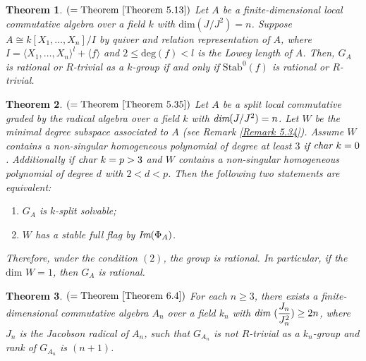 \documentclass[12pt]{amsart}
\newtheorem{thmI}{Theorem}
\theoremstyle{definition}
\numberwithin{equation}{section}
\begin{document}
\begin{thmI}
$(=\text{Theorem }\ref{Theorem 5.13})$ Let $A$ be a finite-dimensional local commutative algebra over a field $k$ with $\text{dim}(J/J^2)=n$. Suppose $A\cong k[X_1,\dots, X_n]/I$ by quiver and relation representation of $A$, where $I=\langle X_1,\dots, X_n\rangle^l+\langle f\rangle$ and $2\leq \mathrm{ deg}(f)<l$ is the Lowey length of $A$. Then, $G_A$ is rational or $R$-trivial as a $k$-group if and only if $\mathrm{Stab}^{0}(f)$ is rational or $R$-trivial.
\end{thmI}
\vskip2mm
\begin{thmI}
$(=\text{Theorem }\ref{Theorem 5.35})$ Let $A$ be a split local commutative graded by the radical algebra over a field $k$ with $\emph{dim}(J/J^2)=n$. Let $W$ be the minimal degree subspace associated to $A$ (see Remark \ref{Remark 5.34}). Assume $W$ contains a non-singular homogeneous polynomial of degree at least $3$ if $\emph{char }k=0$. Additionally if $\emph{char }k=p>3$ and $W$ contains a non-singular homogeneous polynomial of degree $d$ with $2<d<p$. Then the following two statements are equivalent:
\vskip2mm
\begin{enumerate}
\item $G_A$ is $k$-split solvable; 
\vskip2mm
\item $W$ has a stable full flag by $\emph{\text{Im}}(\Phi_A)$.
\end{enumerate}
Therefore, under the condition $(2)$, the group is rational. In particular, if the $\text{dim }W=1$, then $G_A$ is rational.
\end{thmI}
\vskip2mm
\begin{thmI}
$(=\text{Theorem }\ref{Theorem 6.4})$ For each $n\geq3$, there exists a finite-dimensional commutative algebra $A_n$ over a field $k_n$ with $\emph{dim } \displaystyle (\frac{J_n}{J_n^2})\geq 2n$, where $J_n$ is the Jacobson radical of $A_n$, such that $G_{A_n}$ is not $R$-trivial as a $k_n$-group and rank of $G_{A_n}$ is $(n+1)$. 
\end{thmI}
\vspace{0.2in}
\end{document}
